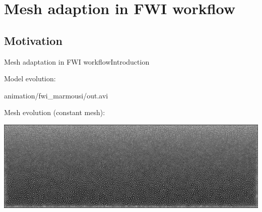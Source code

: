 
\section{Mesh adaption in FWI workflow}
\subsection{Motivation}
\begin{frame}{Mesh adaptation in FWI workflow}{Introduction}
  \begin{block}{Model evolution:}
    \begin{center}
            {animation/fwi_marmousi/out.avi}
    \end{center}
  \end{block}

  \begin{block}{Mesh evolution (constant mesh):}
    \begin{center}
      \includegraphics[scale=0.16]{animation/fwi_mesh1_black/fwi_mesh1-00.png}
    \end{center}
  \end{block}

\end{frame}


